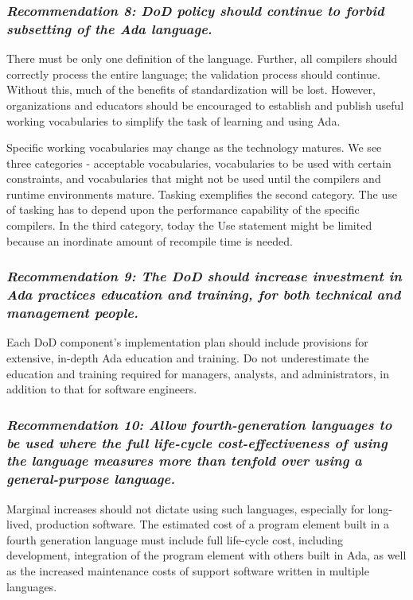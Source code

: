 \documentclass[11pt,final]{article}
\begin{document}
\label{rec:8}
\subsubsection*{\textit{Recommendation 8: DoD policy should continue to forbid subsetting of the Ada
language.}}

There must be only one definition of the language. Further, all compilers
should correctly process the entire language; the validation process should
continue. Without this, much of the benefits of standardization will be lost.
However, organizations and educators should be encouraged to establish and
publish useful working vocabularies to simplify the task of learning and using
Ada.

Specific working vocabularies may change as the technology matures. We see
three categories - acceptable vocabularies, vocabularies to be used with
certain constraints, and vocabularies that might not be used until the
compilers and runtime environments mature. Tasking exemplifies the second
category. The use of tasking has to depend upon the performance capability of
the specific compilers. In the third category, today the Use statement might be
limited because an inordinate amount of recompile time is needed.

\label{rec:9}
\subsubsection*{\textit{Recommendation 9: The DoD should increase investment in
Ada practices education and training, for both technical and management
people.}}

Each DoD component’s implementation plan should include provisions for
extensive, in-depth Ada education and training. Do not underestimate the
education and training required for managers, analysts, and administrators, in
addition to that for software engineers.

\label{rec:10}
\subsubsection*{\textit{Recommendation 10: Allow fourth-generation languages to
be used where the full life-cycle cost-effectiveness of using the language
measures more than tenfold over using a general-purpose language.}}

Marginal increases should not dictate using such languages, especially for
long-lived, production software. The estimated cost of a program element built
in a fourth generation language must include full life-cycle cost, including
development, integration of the program element with others built in Ada, as
well as the increased maintenance costs of support software written in multiple
languages.
\end{document}
